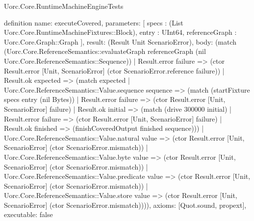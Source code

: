 \begin{lexlean}{Uorc.Core.RuntimeMachineEngineTests}
\begin{semanticmodule}
definition{
  name: executeCovered,
  parameters: [
    specs : (List Uorc.Core.RuntimeMachineFixtures::Block),
    entry : UInt64,
    referenceGraph : Uorc.Core.Graph::Graph
  ],
  result: (Result Unit ScenarioError),
  body: (match (Uorc.Core.ReferenceSemantics::evaluateGraph referenceGraph (nil Uorc.Core.ReferenceSemantics::Sequence))
    | Result.error failure => (ctor Result.error [Unit, ScenarioError] (ctor ScenarioError.reference failure))
    | Result.ok expected => (match expected
      | Uorc.Core.ReferenceSemantics::Value.sequence sequence => (match (startFixture specs entry (nil Bytes))
        | Result.error failure => (ctor Result.error [Unit, ScenarioError] failure)
        | Result.ok initial => (match (drive 300000 initial)
          | Result.error failure => (ctor Result.error [Unit, ScenarioError] failure)
          | Result.ok finished => (finishCoveredOutput finished sequence)))
      | Uorc.Core.ReferenceSemantics::Value.natural value => (ctor Result.error [Unit, ScenarioError] (ctor ScenarioError.mismatch))
      | Uorc.Core.ReferenceSemantics::Value.byte value => (ctor Result.error [Unit, ScenarioError] (ctor ScenarioError.mismatch))
      | Uorc.Core.ReferenceSemantics::Value.predicate value => (ctor Result.error [Unit, ScenarioError] (ctor ScenarioError.mismatch))
      | Uorc.Core.ReferenceSemantics::Value.store value => (ctor Result.error [Unit, ScenarioError] (ctor ScenarioError.mismatch)))),
  axioms: [Quot.sound, propext],
  executable: false
}


\end{semanticmodule}
\end{lexlean}
